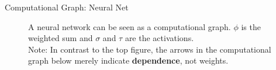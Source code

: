 \begin{frame} {Computational Graph: Neural Net}
  \begin{figure}
      \centering
        \caption{A neural network can be seen as a computational graph. $\phi$ is the weighted sum and $\sigma$ and $\tau$ are the activations. \\
        Note: In contrast to the top figure, the arrows in the computational graph below merely indicate \textbf{dependence}, not weights.}
    \end{figure}
\end{frame}
%   



